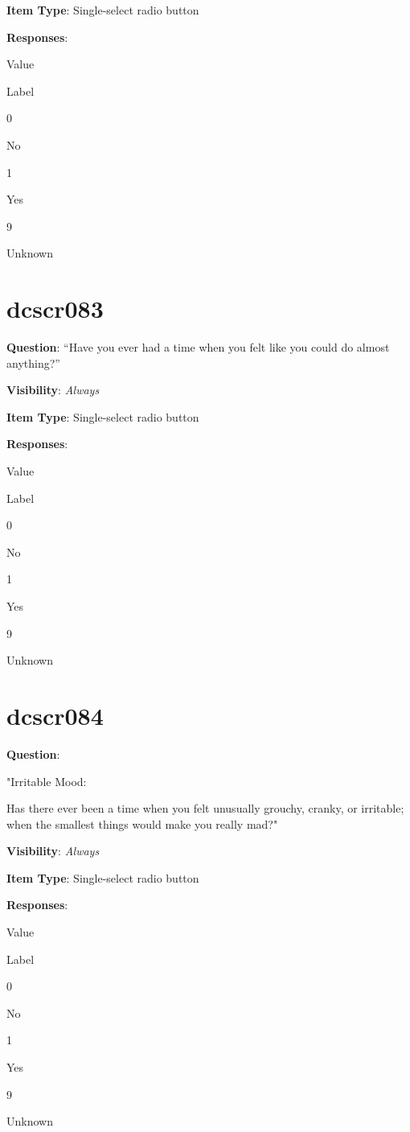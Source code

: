\documentclass[]{book}
\begin{document}
\textbf{Item Type}: Single-select radio button

\textbf{Responses}:

Value

Label

0

No

1

Yes

9

Unknown

\hypertarget{dcscr083}{%
\section{dcscr083}\label{dcscr083}}

\textbf{Question}: ``Have you ever had a time when you felt like you could do almost anything?''

\textbf{Visibility}: \emph{Always}

\textbf{Item Type}: Single-select radio button

\textbf{Responses}:

Value

Label

0

No

1

Yes

9

Unknown

\hypertarget{dcscr084}{%
\section{dcscr084}\label{dcscr084}}

\textbf{Question}:

"Irritable Mood:

Has there ever been a time when you felt unusually grouchy, cranky, or irritable; when the smallest things would make you really mad?"

\textbf{Visibility}: \emph{Always}

\textbf{Item Type}: Single-select radio button

\textbf{Responses}:

Value

Label

0

No

1

Yes

9

Unknown
\end{document}
